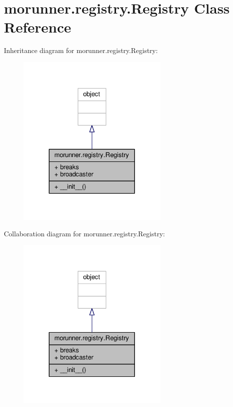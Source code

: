 \hypertarget{classmorunner_1_1registry_1_1Registry}{}\section{morunner.\+registry.\+Registry Class Reference}
\label{classmorunner_1_1registry_1_1Registry}


Inheritance diagram for morunner.\+registry.\+Registry\+:
\nopagebreak
\begin{figure}[H]
\begin{center}
\leavevmode
\includegraphics[width=212pt]{classmorunner_1_1registry_1_1Registry__inherit__graph}
\end{center}
\end{figure}


Collaboration diagram for morunner.\+registry.\+Registry\+:
\nopagebreak
\begin{figure}[H]
\begin{center}
\leavevmode
\includegraphics[width=212pt]{classmorunner_1_1registry_1_1Registry__coll__graph}
\end{center}
\end{figure}
